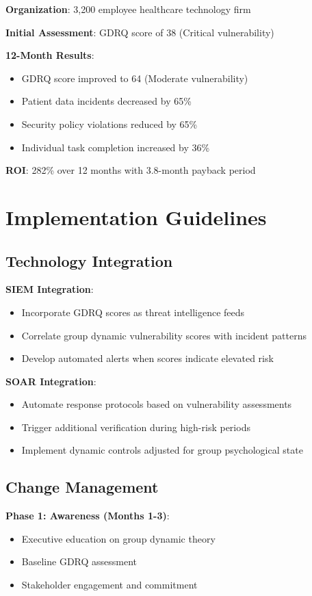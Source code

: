 \documentclass[11pt,a4paper]{article}
\begin{document}
\textbf{Organization}: 3,200 employee healthcare technology firm

\textbf{Initial Assessment}: GDRQ score of 38 (Critical vulnerability)

\textbf{12-Month Results}:
\begin{itemize}
\item GDRQ score improved to 64 (Moderate vulnerability)
\item Patient data incidents decreased by 65\%
\item Security policy violations reduced by 65\%
\item Individual task completion increased by 36\%
\end{itemize}

\textbf{ROI}: 282\% over 12 months with 3.8-month payback period

\section{Implementation Guidelines}

\subsection{Technology Integration}

\textbf{SIEM Integration}:
\begin{itemize}
\item Incorporate GDRQ scores as threat intelligence feeds
\item Correlate group dynamic vulnerability scores with incident patterns
\item Develop automated alerts when scores indicate elevated risk
\end{itemize}

\textbf{SOAR Integration}:
\begin{itemize}
\item Automate response protocols based on vulnerability assessments
\item Trigger additional verification during high-risk periods
\item Implement dynamic controls adjusted for group psychological state
\end{itemize}

\subsection{Change Management}

\textbf{Phase 1: Awareness (Months 1-3)}:
\begin{itemize}
\item Executive education on group dynamic theory
\item Baseline GDRQ assessment
\item Stakeholder engagement and commitment
\end{itemize}
\end{document}
